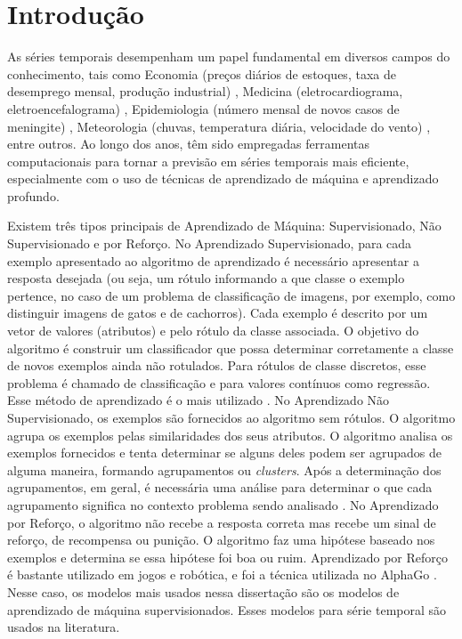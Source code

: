 



\section{Introdu{\c c}{\~a}o} \label{sec:int}


As séries temporais desempenham um papel fundamental em diversos campos do conhecimento, tais como Economia (preços diários de estoques, taxa de desemprego mensal, produção industrial) \cite{industrial_production,unemployment_rate,stock_prices}, Medicina (eletrocardiograma, eletroencefalograma) \cite{ecg, eeg}, Epidemiologia (número mensal de novos casos de meningite) \cite{meningitis}, Meteorologia (chuvas, temperatura diária, velocidade do vento) \cite{wind_speed,temperature,rainfall},  entre outros. Ao longo dos anos, têm sido empregadas ferramentas computacionais para tornar a previsão em séries temporais mais eficiente, especialmente com o uso de técnicas de aprendizado de máquina e aprendizado profundo.

Existem três tipos principais de Aprendizado de Máquina: Supervisionado, Não Supervisionado e por Reforço.
No Aprendizado Supervisionado, para cada exemplo apresentado ao algoritmo de aprendizado é necessário apresentar a resposta desejada (ou seja, um rótulo informando a que classe o exemplo pertence, no caso de um problema de classificação de imagens, por exemplo, como distinguir imagens de gatos e de cachorros). Cada exemplo é descrito por um vetor de valores (atributos) e pelo rótulo da classe associada. O objetivo do algoritmo é construir um classificador que possa determinar corretamente a classe de novos exemplos ainda não rotulados. Para rótulos de classe discretos, esse problema é chamado de classificação e para valores contínuos como regressão. Esse método de aprendizado é o mais utilizado \cite{Silva2021}.
No Aprendizado Não Supervisionado, os exemplos são fornecidos ao algoritmo sem rótulos. O algoritmo agrupa os exemplos pelas similaridades dos seus atributos. O algoritmo analisa os exemplos fornecidos e tenta determinar se alguns deles podem ser agrupados de alguma maneira, formando agrupamentos ou \textit{clusters}. Após a determinação dos agrupamentos, em geral, é necessária uma análise para determinar o que cada agrupamento significa no contexto problema sendo analisado \cite{Silva2021}.
No Aprendizado por Reforço, o algoritmo não recebe a resposta correta mas recebe um sinal de reforço, de recompensa ou punição. O algoritmo faz uma hipótese baseado nos exemplos e determina se essa hipótese foi boa ou ruim. Aprendizado por Reforço é bastante utilizado em jogos e robótica, e foi a técnica utilizada no AlphaGo \cite{Silva2021}. 
Nesse caso, os modelos mais usados nessa dissertação são os modelos de aprendizado de máquina supervisionados. Esses modelos para série temporal são usados na literatura.

